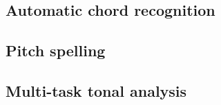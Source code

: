 \subsection{Automatic chord recognition}
\subsection{Pitch spelling}
\subsection{Multi-task tonal analysis}


